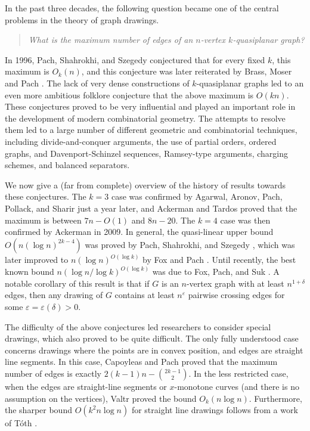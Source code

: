 \documentclass[11pt]{amsart}
\theoremstyle{definition}
\newcommand{\eps}{\varepsilon}
\begin{document}
In the past three decades, the following question became one of the central problems in the theory of graph drawings.
\smallskip
\begin{quote}\centering
\textit{What is the maximum number of edges of an $n$-vertex $k$-quasiplanar graph?  }
\end{quote}
\smallskip

In 1996, Pach, Shahrokhi, and Szegedy \cite{PSSz} conjectured that for every fixed $k$, this maximum is $O_k(n)$, and this conjecture was later reiterated by Brass, Moser and Pach \cite{BMP}. The lack of very dense constructions of $k$-quasiplanar graphs led to an even more ambitious folklore conjecture that the above maximum is $O(kn)$. These conjectures proved to be very influential and played an important role in the development of modern combinatorial geometry. The attempts to resolve them led to a large number of different geometric and combinatorial techniques, including divide-and-conquer arguments, the use of partial orders, ordered graphs, and Davenport-Schinzel sequences, Ramsey-type arguments, charging schemes, and balanced separators. 

We now give a (far from complete) overview of the history of results towards these conjectures. The $k=3$ case was confirmed by Agarwal, Aronov, Pach, Pollack, and Sharir \cite{AAPPS} just a year later, and Ackerman and Tardos \cite{AT} proved that the maximum is between $7n-O(1)$ and $8n-20$. The $k=4$ case was then confirmed by Ackerman \cite{Ackerman} in 2009. In general, the quasi-linear upper bound $O(n(\log n)^{2k-4})$ was proved by Pach, Shahrokhi, and Szegedy \cite{PSSz}, which was later improved to $n(\log n)^{O(\log k)}$ by Fox and Pach \cite{FP}. Until recently, the best known bound $n(\log n/\log k)^{O(\log k)}$ was due to Fox, Pach, and Suk \cite{FPS}. A notable corollary of this result is that if $G$ is an $n$-vertex graph with at least $n^{1+\delta}$ edges, then any drawing of $G$ contains at least $n^{\eps}$ pairwise crossing edges for some $\eps=\eps(\delta)>0$.

The difficulty of the above conjectures led researchers to consider special drawings, which also proved to be quite difficult. The only fully understood case concerns drawings where the points are in convex position, and edges are straight line segments. In this case, Capoyleas and Pach \cite{CP} proved that the maximum number of edges is exactly $2(k-1)n - \binom{2k-1}{2}$. In the less restricted case, when the edges are straight-line segments or $x$-monotone curves (and there is no assumption on the vertices), Valtr \cite{Valtr,Valtr2} proved the bound $O_k(n\log n)$. Furthermore, the sharper bound $O(k^2n\log n)$ for straight line drawings follows from a work of T\'oth \cite{Toth}.
\end{document}
